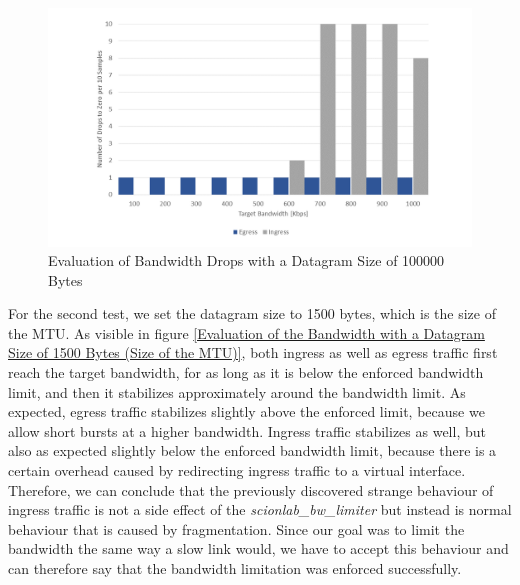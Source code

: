 \begin{figure}[h]
	\centering
	\includegraphics[width=\textwidth]{img/Evaluation-Zeros-Big-Buffer.png}
	\caption{Evaluation of Bandwidth Drops with a Datagram Size of 100000 Bytes}
	\label{Evaluation of Bandwidth Drops with a Datagram Size of 100000 Bytes}
\end{figure}
\newpage

For the second test, we set the datagram size to 1500 bytes, which is the size of the \acs{MTU}. As visible in figure \ref{Evaluation of the Bandwidth with a Datagram Size of 1500 Bytes (Size of the MTU)}, both ingress as well as egress traffic first reach the target bandwidth, for as long as it is below the enforced bandwidth limit, and then it stabilizes approximately around the bandwidth limit. As expected, egress traffic stabilizes slightly above the enforced limit, because we allow short bursts at a higher bandwidth. Ingress traffic stabilizes as well, but also as expected slightly below the enforced bandwidth limit, because there is a certain overhead caused by redirecting ingress traffic to a virtual interface.
\\
Therefore, we can conclude that the previously discovered strange behaviour of ingress traffic is not a side effect of the \textit{scionlab\_bw\_limiter} but instead is normal behaviour that is caused by fragmentation. Since our goal was to limit the bandwidth the same way a slow link would, we have to accept this behaviour and can therefore say that the bandwidth limitation was enforced successfully.

